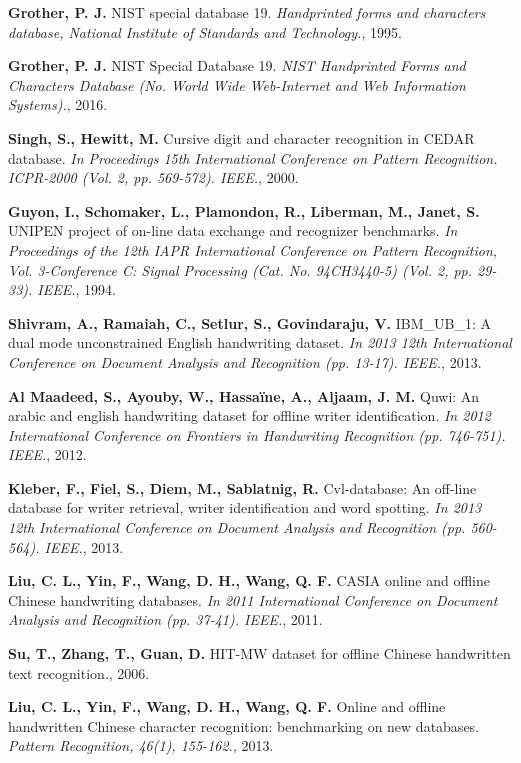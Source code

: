 \documentclass[eng]{simposium}
\begin{document}
\begin{thebibliography}{99}
\textbf{Grother, P. J.} NIST special database 19. \emph{Handprinted forms and characters database, National Institute of Standards and Technology.}, 1995.

\textbf{Grother, P. J.} NIST Special Database 19. \emph{NIST Handprinted Forms and Characters Database (No. World Wide Web-Internet and Web Information Systems).}, 2016.

\textbf{Singh, S., Hewitt, M.} Cursive digit and character recognition in CEDAR database. \emph{In Proceedings 15th International Conference on Pattern Recognition. ICPR-2000 (Vol. 2, pp. 569-572). IEEE.}, 2000.

\textbf{Guyon, I., Schomaker, L., Plamondon, R., Liberman, M., Janet, S.} UNIPEN project of on-line data exchange and recognizer benchmarks. \emph{In Proceedings of the 12th IAPR International Conference on Pattern Recognition, Vol. 3-Conference C: Signal Processing (Cat. No. 94CH3440-5) (Vol. 2, pp. 29-33). IEEE.}, 1994.

\textbf{Shivram, A., Ramaiah, C., Setlur, S., Govindaraju, V.} IBM\_UB\_1: A dual mode unconstrained English handwriting dataset. \emph{In 2013 12th International Conference on Document Analysis and Recognition (pp. 13-17). IEEE.}, 2013.

\textbf{Al Maadeed, S., Ayouby, W., Hassaïne, A., Aljaam, J. M.} Quwi: An arabic and english handwriting dataset for offline writer identification. \emph{In 2012 International Conference on Frontiers in Handwriting Recognition (pp. 746-751). IEEE.}, 2012.

\textbf{Kleber, F., Fiel, S., Diem, M., Sablatnig, R.} Cvl-database: An off-line database for writer retrieval, writer identification and word spotting. \emph{In 2013 12th International Conference on Document Analysis and Recognition (pp. 560-564). IEEE.}, 2013.

\textbf{Liu, C. L., Yin, F., Wang, D. H., Wang, Q. F.} CASIA online and offline Chinese handwriting databases. \emph{In 2011 International Conference on Document Analysis and Recognition (pp. 37-41). IEEE.}, 2011.

\textbf{Su, T., Zhang, T., Guan, D.} HIT-MW dataset for offline Chinese handwritten text recognition., 2006.

\textbf{Liu, C. L., Yin, F., Wang, D. H., Wang, Q. F.} Online and offline handwritten Chinese character recognition: benchmarking on new databases. \emph{Pattern Recognition, 46(1), 155-162.}, 2013.


\end{thebibliography}
\end{document}
